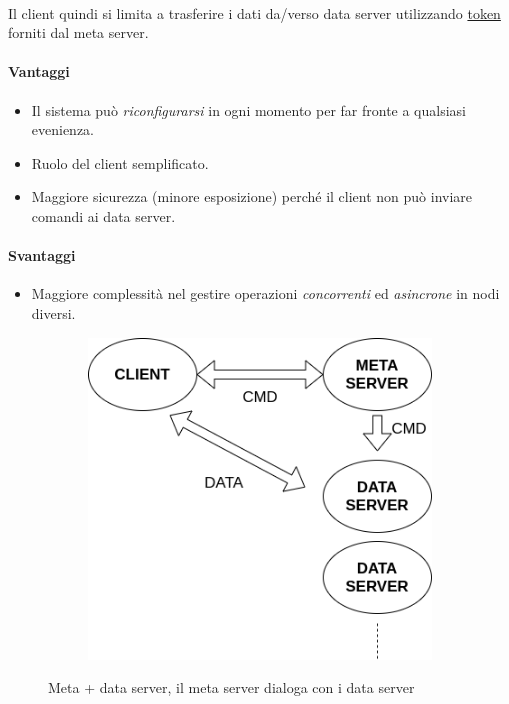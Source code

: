 \documentclass[11pt,a4paper,english]{article}
\begin{document}
\paragraph{} Il client quindi si limita a trasferire i dati da/verso data server utilizzando \underline{token} forniti dal meta server. 

\paragraph{Vantaggi} \begin{itemize}
	\item Il sistema può \emph{riconfigurarsi} in ogni momento per far fronte a qualsiasi evenienza.
	\item Ruolo del client semplificato.
	\item Maggiore sicurezza (minore esposizione) perché il client non può inviare comandi ai data server.
\end{itemize}


\paragraph{Svantaggi} \begin{itemize}
	\item Maggiore complessità nel gestire operazioni \emph{concorrenti} ed \emph{asincrone} in nodi diversi.
\end{itemize}

\begin{figure}[H]
	\centering
	\begin{subfigure}{0.60\linewidth}
		\includegraphics[width=\linewidth]{../diagrams/architettura/6.png}
	\end{subfigure}
	\caption{Meta + data server, il meta server dialoga con i data server}
\end{figure}
\end{document}
